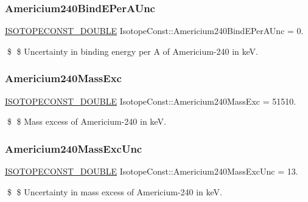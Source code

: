 \subsubsection{\texorpdfstring{Americium240\+Bind\+E\+Per\+A\+Unc}{Americium240BindEPerAUnc}}
{\footnotesize\ttfamily \mbox{\hyperlink{group___isotope_const-_macros_ga8f45a7272ce02c0b4c65c44636ed719a}{I\+S\+O\+T\+O\+P\+E\+C\+O\+N\+S\+T\+\_\+\+D\+O\+U\+B\+LE}} Isotope\+Const\+::\+Americium240\+Bind\+E\+Per\+A\+Unc = 0.}

\$ \$ Uncertainty in binding energy per A of Americium-\/240 in keV. \mbox{\label{group___isotope_const-_americium-_am240_gaf7e3bf12a5f71d1627bee502b9e00f59}} 
\subsubsection{\texorpdfstring{Americium240\+Mass\+Exc}{Americium240MassExc}}
{\footnotesize\ttfamily \mbox{\hyperlink{group___isotope_const-_macros_ga8f45a7272ce02c0b4c65c44636ed719a}{I\+S\+O\+T\+O\+P\+E\+C\+O\+N\+S\+T\+\_\+\+D\+O\+U\+B\+LE}} Isotope\+Const\+::\+Americium240\+Mass\+Exc = 51510.}

\$ \$ Mass excess of Americium-\/240 in keV. \mbox{\label{group___isotope_const-_americium-_am240_gad00d30b30875898eeea63828c254d3be}} 
\subsubsection{\texorpdfstring{Americium240\+Mass\+Exc\+Unc}{Americium240MassExcUnc}}
{\footnotesize\ttfamily \mbox{\hyperlink{group___isotope_const-_macros_ga8f45a7272ce02c0b4c65c44636ed719a}{I\+S\+O\+T\+O\+P\+E\+C\+O\+N\+S\+T\+\_\+\+D\+O\+U\+B\+LE}} Isotope\+Const\+::\+Americium240\+Mass\+Exc\+Unc = 13.}

\$ \$ Uncertainty in mass excess of Americium-\/240 in keV. \mbox{\label{group___isotope_const-_americium-_am240_gac0b793dd5556297902f23a1d4d5f3d8a}} 
